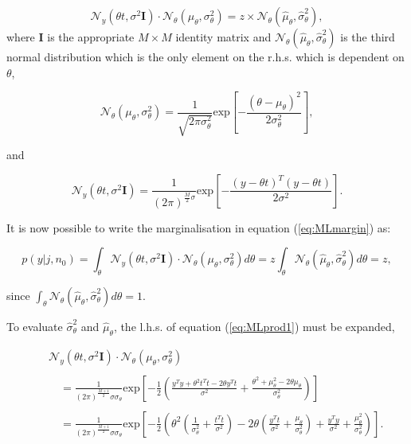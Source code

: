 \begin{equation}\label{eq:MLprod1}
\mathcal{N}_y(\theta t,\sigma^2 \textbf{I})\cdot\mathcal{N}_\theta(\mu_\theta,\sigma^2_\theta) = z \times \mathcal{N}_\theta(\hat{\mu}_\theta,\hat{\sigma}^2_\theta),
\end{equation}
where $\textbf{I}$ is the appropriate $M \times M$ identity matrix and $\mathcal{N}_\theta(\hat{\mu}_\theta,\hat{\sigma}_\theta^2)$ is the third normal distribution which is the only element on the r.h.s. which is dependent on $\theta$,

\begin{equation}\label{eq:MLtheta2}
\mathcal{N}_\theta(\mu_\theta,\sigma^2_\theta) = \frac{1}{\sqrt{2 \pi \sigma_\theta^2}} \textrm{exp}\left[-\frac{\left(\theta - \mu_\theta\right)^2}{2\sigma_\theta^2}\right],
\end{equation}

and

\begin{equation}\label{eq:MLnoise2}
\mathcal{N}_y(\theta t,\sigma^2 \textbf{I}) = \frac{1}{\left(2 \pi\right)^{\frac{M}{2}\sigma}} \textrm{exp}\left[-\frac{\left(y - \theta t\right)^T\left(y - \theta t\right)}{2\sigma^2}\right].
\end{equation}

It is now possible to write the marginalisation in equation (\ref{eq:MLmargin}) as:

\begin{equation}\label{eq:MLmargin2}
p(y|j,n_0)=\int_\theta \mathcal{N}_y(\theta t,\sigma^2 \textbf{I})\cdot\mathcal{N}_\theta(\mu_\theta,\sigma^2_\theta) d\theta = z \int_\theta \mathcal{N}_\theta(\hat{\mu}_\theta,\hat{\sigma}^2_\theta) d\theta = z,
\end{equation}

since $\int_\theta \mathcal{N}_\theta(\hat{\mu}_\theta,\hat{\sigma}^2_\theta) d\theta = 1$.

To evaluate $\hat{\sigma}^2_\theta$ and $\hat{\mu}_\theta$, the l.h.s. of equation (\ref{eq:MLprod1}) must be expanded,

\begin{eqnarray}\label{eq:MLprod3}
& & \mathcal{N}_y(\theta t,\sigma^2 \textbf{I})\cdot\mathcal{N}_\theta(\mu_\theta,\sigma^2_\theta) \\\nonumber{}\\\nonumber
& & \quad = \frac{1}{\left(2\pi\right)^{\frac{M+1}{2}} \sigma \sigma_\theta} \textrm{exp}\left[-\frac{1}{2}\left(\frac{y^Ty +\theta^2t^Tt-2\theta y^T t}{\sigma^2}+\frac{\theta^2 + \mu^2_\theta-2\theta\mu_\theta}{\sigma_\theta^2}\right)\right]\\\nonumber{}\\\nonumber
& & \quad = \frac{1}{\left(2\pi\right)^{\frac{M+1}{2}} \sigma \sigma_\theta} \textrm{exp}\left[-\frac{1}{2}\left(\theta^2 \left(\frac{1}{\sigma_\theta^2}+\frac{t^T t}{\sigma^2}\right) - 2\theta\left(\frac{y^T t}{\sigma^2}+\frac{\mu_\theta}{\sigma_\theta^2}\right) + \frac{y^Ty}{\sigma^2} +\frac{\mu_\theta^2}{\sigma_\theta^2}\right)\right].
\end{eqnarray}


